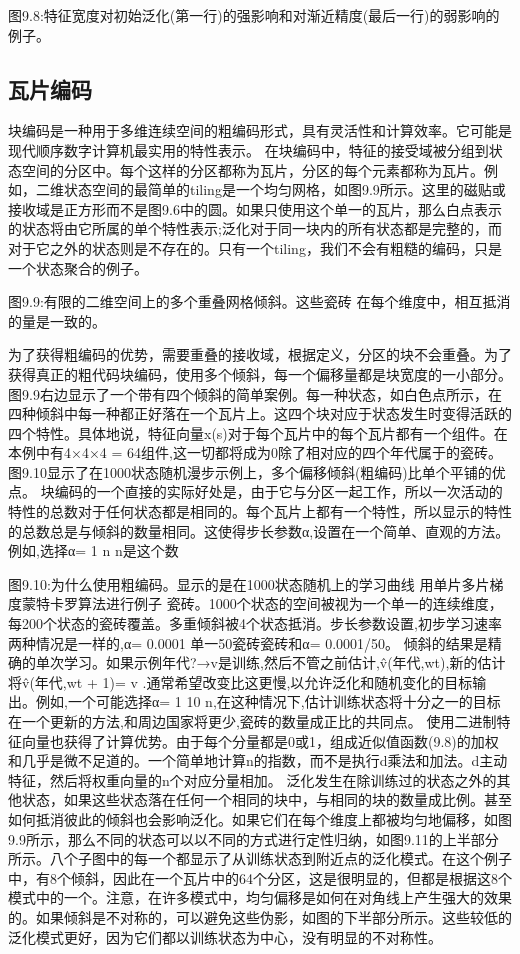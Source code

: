 {图9.8:特征宽度对初始泛化(第一行)的强影响和对渐近精度(最后一行)的弱影响的例子。

\subsection{瓦片编码}
块编码是一种用于多维连续空间的粗编码形式，具有灵活性和计算效率。它可能是现代顺序数字计算机最实用的特性表示。
在块编码中，特征的接受域被分组到状态空间的分区中。每个这样的分区都称为瓦片，分区的每个元素都称为瓦片。例如，二维状态空间的最简单的tiling是一个均匀网格，如图9.9所示。这里的磁贴或接收域是正方形而不是图9.6中的圆。如果只使用这个单一的瓦片，那么白点表示的状态将由它所属的单个特性表示;泛化对于同一块内的所有状态都是完整的，而对于它之外的状态则是不存在的。只有一个tiling，我们不会有粗糙的编码，只是一个状态聚合的例子。
 

图9.9:有限的二维空间上的多个重叠网格倾斜。这些瓷砖
在每个维度中，相互抵消的量是一致的。


为了获得粗编码的优势，需要重叠的接收域，根据定义，分区的块不会重叠。为了获得真正的粗代码块编码，使用多个倾斜，每一个偏移量都是块宽度的一小部分。图9.9右边显示了一个带有四个倾斜的简单案例。每一种状态，如白色点所示，在四种倾斜中每一种都正好落在一个瓦片上。这四个块对应于状态发生时变得活跃的四个特性。具体地说，特征向量x(s)对于每个瓦片中的每个瓦片都有一个组件。在本例中有4×4×4 = 64组件,这一切都将成为0除了相对应的四个年代属于的瓷砖。图9.10显示了在1000状态随机漫步示例上，多个偏移倾斜(粗编码)比单个平铺的优点。
块编码的一个直接的实际好处是，由于它与分区一起工作，所以一次活动的特性的总数对于任何状态都是相同的。每个瓦片上都有一个特性，所以显示的特性的总数总是与倾斜的数量相同。这使得步长参数α,设置在一个简单、直观的方法。例如,选择α= 1
n
n是这个数

图9.10:为什么使用粗编码。显示的是在1000状态随机上的学习曲线
用单片多片梯度蒙特卡罗算法进行例子
瓷砖。1000个状态的空间被视为一个单一的连续维度，每200个状态的瓷砖覆盖。多重倾斜被4个状态抵消。步长参数设置,初步学习速率两种情况是一样的,α= 0.0001
单一50瓷砖瓷砖和α= 0.0001/50。
倾斜的结果是精确的单次学习。如果示例年代?→v是训练,然后不管之前估计,v̂(年代,wt),新的估计将v̂(年代,wt + 1)= v .通常希望改变比这更慢,以允许泛化和随机变化的目标输出。例如,一个可能选择α= 1 10 n,在这种情况下,估计训练状态将十分之一的目标在一个更新的方法,和周边国家将更少,瓷砖的数量成正比的共同点。
使用二进制特征向量也获得了计算优势。由于每个分量都是0或1，组成近似值函数(9.8)的加权和几乎是微不足道的。一个简单地计算n的指数，而不是执行d乘法和加法。d主动特征，然后将权重向量的n个对应分量相加。
泛化发生在除训练过的状态之外的其他状态，如果这些状态落在任何一个相同的块中，与相同的块的数量成比例。甚至如何抵消彼此的倾斜也会影响泛化。如果它们在每个维度上都被均匀地偏移，如图9.9所示，那么不同的状态可以以不同的方式进行定性归纳，如图9.11的上半部分所示。八个子图中的每一个都显示了从训练状态到附近点的泛化模式。在这个例子中，有8个倾斜，因此在一个瓦片中的64个分区，这是很明显的，但都是根据这8个模式中的一个。注意，在许多模式中，均匀偏移是如何在对角线上产生强大的效果的。如果倾斜是不对称的，可以避免这些伪影，如图的下半部分所示。这些较低的泛化模式更好，因为它们都以训练状态为中心，没有明显的不对称性。

}
